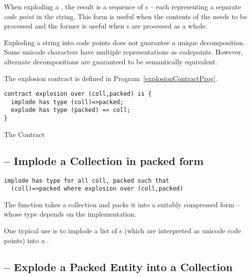 When exploding a , the result is a sequence of s -- each representing a separate \emph{code point} in the string. This form is useful when the contents of the  needs to be processed and the former is useful when s are processed as a whole.

\begin{aside}
Exploding a string into code points does not guarantee a unique decomposition. Some unicode characters have multiple representations as codepoints. However, alternate decompositions are guaranteed to be semantically equivalent.
\end{aside}

The explosion contract is defined in Program~\vref{explosionContractProg}.

\begin{program}[H]
\begin{lstlisting}
contract explosion over (coll,packed) is {
  implode has type (coll)=>packed;
  explode has type (packed) => coll;
}
\end{lstlisting}
\caption{The  Contract\label{explosionContractProg}}
\end{program}

\subsection{ -- Implode a Collection in packed form}
\label{implodeFunction}

\begin{lstlisting}
implode has type for all coll, packed such that 
  (coll)=>packed where explosion over (coll,packed)
\end{lstlisting}

\noindent
The  function takes a collection and packs it into a suitably compressed form -- whose type depends on the implementation.

\begin{aside}
One typical use is to implode a  list of s (which are interpreted as unicode code points) into a .\end{aside}

\subsection{ -- Explode a Packed Entity into a Collection}
\label{explodeFunction}

